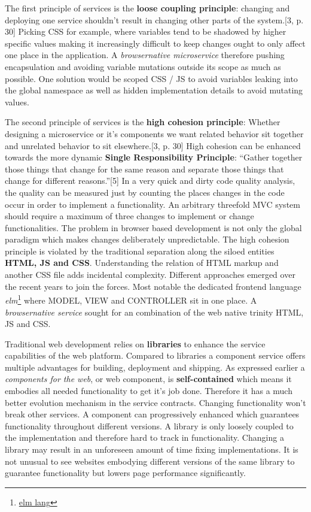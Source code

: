 \documentclass[]{article}
\begin{document}
The first principle of services is the \textbf{loose coupling
principle}: changing and deploying one service shouldn't result in
changing other parts of the system.{[}3, p. 30{]} Picking CSS for
example, where variables tend to be shadowed by higher specific values
making it increasingly difficult to keep changes ought to only affect
one place in the application. A \emph{browsernative microservice}
therefore pushing encapsulation and avoiding variable mutations outside
its scope as much as possible. One solution would be scoped CSS / JS to
avoid variables leaking into the global namespace as well as hidden
implementation details to avoid mutating values.

The second principle of services is the \textbf{high cohesion
principle}: Whether designing a microservice or it's components we want
related behavior sit together and unrelated behavior to sit
elsewhere.{[}3, p. 30{]} High cohesion can be enhanced towards the more
dynamic \textbf{Single Responsibility Principle}: ``Gather together
those things that change for the same reason and separate those things
that change for different reasons.''{[}5{]} In a very quick and dirty
code quality analysis, the quality can be measured just by counting the
places changes in the code occur in order to implement a functionality.
An arbitrary threefold MVC system should require a maximum of three
changes to implement or change functionalities. The problem in browser
based development is not only the global paradigm which makes changes
deliberately unpredictable. The high cohesion principle is violated by
the traditional separation along the siloed entities \textbf{HTML, JS
and CSS}. Understanding the relation of HTML markup and another CSS file
adds incidental complexity. Different approaches emerged over the recent
years to join the forces. Most notable the dedicated frontend language
\emph{elm}\footnote{\href{http://elm-lang.org/}{elm lang}} where MODEL,
VIEW and CONTROLLER sit in one place. A \emph{browsernative service}
sought for an combination of the web native trinity HTML, JS and CSS.

Traditional web development relies on \textbf{libraries} to enhance the
service capabilities of the web platform. Compared to libraries a
component service offers multiple advantages for building, deployment
and shipping. As expressed earlier a \emph{components for the web}, or
web component, is \textbf{self-contained} which means it embodies all
needed functionality to get it's job done. Therefore it has a much
better evolution mechanism in the service contracts. Changing
functionality won't break other services. A component can progressively
enhanced which guarantees functionality throughout different versions. A
library is only loosely coupled to the implementation and therefore hard
to track in functionality. Changing a library may result in an
unforeseen amount of time fixing implementations. It is not unusual to
see websites embodying different versions of the same library to
guarantee functionality but lowers page performance significantly.
\end{document}
